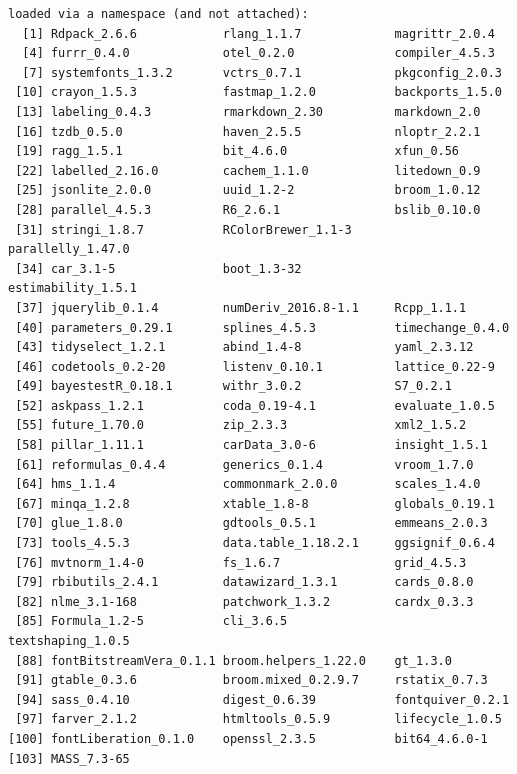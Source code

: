 \documentclass[
  letterpaper,
  DIV=11,
  numbers=noendperiod]{scrartcl}
\begin{document}
\begin{verbatim}
loaded via a namespace (and not attached):
  [1] Rdpack_2.6.6            rlang_1.1.7             magrittr_2.0.4         
  [4] furrr_0.4.0             otel_0.2.0              compiler_4.5.3         
  [7] systemfonts_1.3.2       vctrs_0.7.1             pkgconfig_2.0.3        
 [10] crayon_1.5.3            fastmap_1.2.0           backports_1.5.0        
 [13] labeling_0.4.3          rmarkdown_2.30          markdown_2.0           
 [16] tzdb_0.5.0              haven_2.5.5             nloptr_2.2.1           
 [19] ragg_1.5.1              bit_4.6.0               xfun_0.56              
 [22] labelled_2.16.0         cachem_1.1.0            litedown_0.9           
 [25] jsonlite_2.0.0          uuid_1.2-2              broom_1.0.12           
 [28] parallel_4.5.3          R6_2.6.1                bslib_0.10.0           
 [31] stringi_1.8.7           RColorBrewer_1.1-3      parallelly_1.47.0      
 [34] car_3.1-5               boot_1.3-32             estimability_1.5.1     
 [37] jquerylib_0.1.4         numDeriv_2016.8-1.1     Rcpp_1.1.1             
 [40] parameters_0.29.1       splines_4.5.3           timechange_0.4.0       
 [43] tidyselect_1.2.1        abind_1.4-8             yaml_2.3.12            
 [46] codetools_0.2-20        listenv_0.10.1          lattice_0.22-9         
 [49] bayestestR_0.18.1       withr_3.0.2             S7_0.2.1               
 [52] askpass_1.2.1           coda_0.19-4.1           evaluate_1.0.5         
 [55] future_1.70.0           zip_2.3.3               xml2_1.5.2             
 [58] pillar_1.11.1           carData_3.0-6           insight_1.5.1          
 [61] reformulas_0.4.4        generics_0.1.4          vroom_1.7.0            
 [64] hms_1.1.4               commonmark_2.0.0        scales_1.4.0           
 [67] minqa_1.2.8             xtable_1.8-8            globals_0.19.1         
 [70] glue_1.8.0              gdtools_0.5.1           emmeans_2.0.3          
 [73] tools_4.5.3             data.table_1.18.2.1     ggsignif_0.6.4         
 [76] mvtnorm_1.4-0           fs_1.6.7                grid_4.5.3             
 [79] rbibutils_2.4.1         datawizard_1.3.1        cards_0.8.0            
 [82] nlme_3.1-168            patchwork_1.3.2         cardx_0.3.3            
 [85] Formula_1.2-5           cli_3.6.5               textshaping_1.0.5      
 [88] fontBitstreamVera_0.1.1 broom.helpers_1.22.0    gt_1.3.0               
 [91] gtable_0.3.6            broom.mixed_0.2.9.7     rstatix_0.7.3          
 [94] sass_0.4.10             digest_0.6.39           fontquiver_0.2.1       
 [97] farver_2.1.2            htmltools_0.5.9         lifecycle_1.0.5        
[100] fontLiberation_0.1.0    openssl_2.3.5           bit64_4.6.0-1          
[103] MASS_7.3-65            
\end{verbatim}
\end{document}
